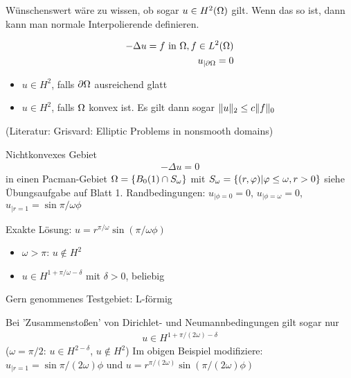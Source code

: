 Wünschenswert wäre zu wissen, ob sogar $u \in H^2(\Omega)$ gilt. Wenn das so ist, dann kann man normale Interpolierende definieren. 
\begin{beispiel}
  \begin{align*}
    - \Delta u = f \text{ in } \Omega, f \in L^2(\Omega)\\
u_{|\partial \Omega} = 0
  \end{align*}
  \begin{itemize}
  \item $u \in H^2$, falls $\partial \Omega$ ausreichend glatt
  \item $u \in H^2$, falls $\Omega$ konvex ist. Es gilt dann sogar $\|u\|_2 \leq c \|f\|_0$
  \end{itemize}
(Literatur: Grisvard: Elliptic Problems in nonsmooth domains)
\end{beispiel}
\begin{beispiel} Nichtkonvexes Gebiet
  \begin{align*}
    - \Delta u = 0
  \end{align*}
in einen Pacman-Gebiet $\Omega = \left\{ B_0(1) \cap S_\omega \right\}$ mit $S_\omega = \left\{ (r, \varphi)| \varphi \leq \omega, r > 0 \right\}$ siehe Übungsaufgabe auf Blatt 1.
Randbedingungen: $u_{|\phi = 0}= 0$, $u_{|\phi = \omega}= 0$, $u_{|r = 1}= \sin \pi/\omega \phi$
  
Exakte Lösung: $u = r^{\pi/\omega} \sin(\pi/\omega \phi)$
\begin{itemize}
\item $\omega > \pi$: $u \notin H^2$ 
\item $u \in H^{1 + \pi/ \omega - \delta}$ mit $\delta > 0$, beliebig
\end{itemize}
Gern genommenes Testgebiet: L-förmig
\end{beispiel}
Bei 'Zusammenstoßen' von Dirichlet- und Neumannbedingungen gilt sogar nur 
\begin{align*}
  u \in H^{1+\pi/(2\omega) - \delta}
\end{align*}
($\omega = \pi/2$: $u \in H^{2- \delta}$, $u \notin H^2$)
Im obigen Beispiel modifiziere: $u_{|r = 1} = \sin\pi/(2 \omega) \phi$ und $u = r^{\pi/(2 \omega)}\sin(\pi/(2 \omega) \phi)$